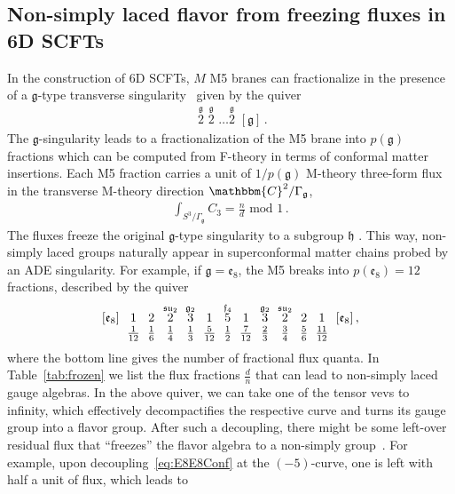 \documentclass[11pt]{article}
\numberwithin{equation}{section}
\newcommand{\fsu}{\mathfrak{su}}
\newcommand{\fg}{\mathfrak{g}}
\newcommand{\ff}{\mathfrak{f}}
\newcommand{\fe}{\mathfrak{e}}
\begin{document}
\subsection{Non-simply laced flavor from freezing fluxes in 6D SCFTs}
In the construction of 6D SCFTs, $M$ M5 branes can fractionalize in the presence of a $\fg$-type transverse singularity~\cite{DelZotto:2014hpa} given by the quiver
\begin{align}
[\fg ] \, \, \overset{\fg}{2}\, \, \overset{\fg}{2}\, \, \ldots \overset{\fg}{2}\,\, [\fg ]\, .
\end{align}
The $\fg$-singularity leads to a fractionalization of the M5 brane into $p(\fg)$ fractions which can be computed from F-theory \cite{DelZotto:2014hpa} in terms of conformal matter insertions. Each M5 fraction carries a unit of $1/p(\fg)$ M-theory three-form flux in the transverse M-theory direction $\mathbbm{C}^2/\Gamma_{\fg}$,
\begin{align}
    \int_{S^3/\Gamma_{\fg}}  C_3 = \frac{n}{d} \text{ mod } 1\, .
\end{align}
The fluxes freeze the original $\fg$-type singularity to a subgroup $\mathfrak{h}$ \cite{deBoer:2001wca}. This way, non-simply laced groups naturally appear in superconformal matter chains probed by an ADE singularity. For example, if $\fg=\fe_8$, the M5 breaks into $p(\fe_8)=12$ fractions, described by the quiver
\begin{align}
\label{eq:E8E8Conf}
\begin{array}{c@{~\;}c@{~\;}c@{~\;}c@{~\;}c@{~\;}c@{~\;}c@{~\;}c@{~\;}c@{~\;}c@{~\;}c@{~\;}c@{~\;}c}
    [\fe_8] & 1 &2 &\overset{\fsu_2}{2} &\overset{\fg_2}{3} &\overset{}{1} &\overset{\ff_4}{5} &\overset{}{1} &\overset{\fg_2}{3}&\overset{\fsu_2}{2} &2 &1 &[\fe_8]  \,,\\ 
  &  \frac{1}{12}& \frac16 & \frac{1}{4} & \frac{1}{3} & \frac{5}{12} & \frac{1}{2} & \frac{7}{12} & \frac{2}{3} & \frac{3}{4} &   \frac{5}{6}  & \frac{11}{12} &  
    \end{array}
\end{align}
%
where the bottom line gives the number of fractional flux quanta. In Table~\ref{tab:frozen} we list the flux fractions $\frac{d}{n}$ that can lead to non-simply laced gauge algebras. In the above quiver, we can take one of the tensor vevs to infinity, which effectively decompactifies the respective curve and turns its gauge group into a flavor group. After such a decoupling, there might be some left-over residual flux that ``freezes'' the flavor algebra to a non-simply group~\cite{Mekareeya:2017sqh}. For example, upon decoupling~\eqref{eq:E8E8Conf} at the $(-5)$-curve, one is left with half a unit of flux, which leads to 
\end{document}
